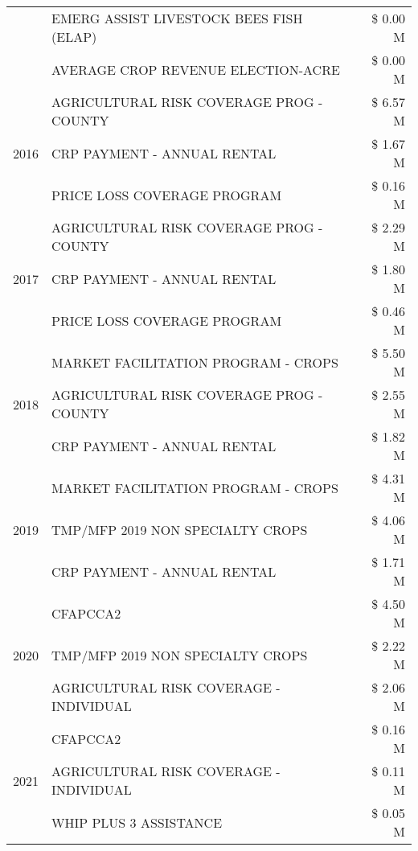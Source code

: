 \begin{tabular}{llr}
 & EMERG ASSIST LIVESTOCK BEES FISH (ELAP) & \$ 0.00 M \\
 & AVERAGE CROP REVENUE ELECTION-ACRE & \$ 0.00 M \\
\cline{1-3}
\multirow[t]{3}{*}{2016} & AGRICULTURAL RISK COVERAGE PROG - COUNTY & \$ 6.57 M \\
 & CRP PAYMENT - ANNUAL RENTAL & \$ 1.67 M \\
 & PRICE LOSS COVERAGE PROGRAM & \$ 0.16 M \\
\cline{1-3}
\multirow[t]{3}{*}{2017} & AGRICULTURAL RISK COVERAGE PROG - COUNTY & \$ 2.29 M \\
 & CRP PAYMENT - ANNUAL RENTAL & \$ 1.80 M \\
 & PRICE LOSS COVERAGE PROGRAM & \$ 0.46 M \\
\cline{1-3}
\multirow[t]{3}{*}{2018} & MARKET FACILITATION PROGRAM - CROPS & \$ 5.50 M \\
 & AGRICULTURAL RISK COVERAGE PROG - COUNTY & \$ 2.55 M \\
 & CRP PAYMENT - ANNUAL RENTAL & \$ 1.82 M \\
\cline{1-3}
\multirow[t]{3}{*}{2019} & MARKET FACILITATION PROGRAM - CROPS & \$ 4.31 M \\
 & TMP/MFP 2019 NON SPECIALTY CROPS & \$ 4.06 M \\
 & CRP PAYMENT - ANNUAL RENTAL & \$ 1.71 M \\
\cline{1-3}
\multirow[t]{3}{*}{2020} & CFAPCCA2 & \$ 4.50 M \\
 & TMP/MFP 2019 NON SPECIALTY CROPS & \$ 2.22 M \\
 & AGRICULTURAL RISK COVERAGE - INDIVIDUAL & \$ 2.06 M \\
\cline{1-3}
\multirow[t]{3}{*}{2021} & CFAPCCA2 & \$ 0.16 M \\
 & AGRICULTURAL RISK COVERAGE - INDIVIDUAL & \$ 0.11 M \\
 & WHIP PLUS 3 ASSISTANCE & \$ 0.05 M \\
\cline{1-3}
\bottomrule
\end{tabular}
